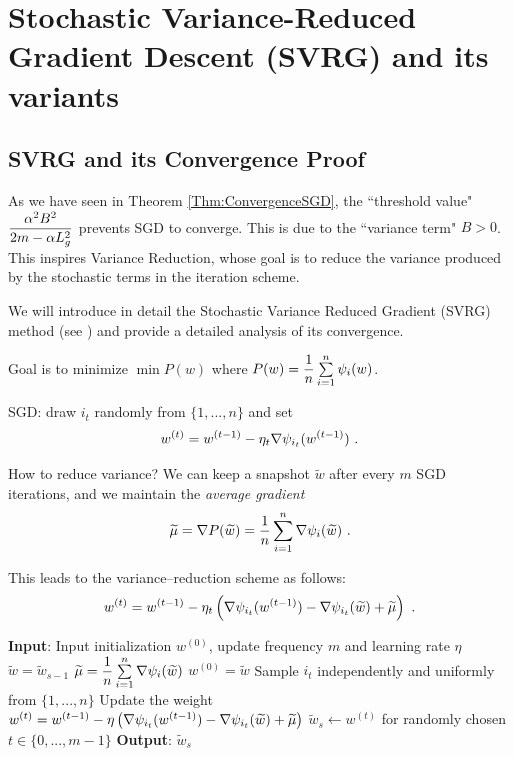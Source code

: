 \section{Stochastic Variance-Reduced Gradient Descent (SVRG) and its variants}

\subsection{SVRG and its Convergence Proof}

As we have seen in Theorem \ref{Thm:ConvergenceSGD}, the ``threshold value" $\dfrac{\alpha^2 B^2}{2m - \alpha L_g^2}$ prevents SGD to converge. This is due to the ``variance term" $B>0$. This inspires Variance Reduction, whose goal is to reduce the variance produced by the stochastic terms in the iteration scheme.

We will introduce in detail the Stochastic Variance Reduced Gradient (SVRG) method (see \cite{johnsonzhangsvrg2013}) and provide a detailed analysis of its convergence.

Goal is to minimize $\min P(w)$ where $P(w)=\dfrac{1}{n}\sum\limits_{i=1}^n \psi_i(w)$.

SGD: draw $i_t$ randomly from $\{1,...,n\}$ and set
$$w^{(t)}=w^{(t-1)}-\eta_t \nabla \psi_{i_t}(w^{(t-1)}) \ .$$

How to reduce variance? We can keep a snapshot $\widetilde{w}$ after every $m$ SGD iterations, and we
maintain the \textit{average gradient}
$$\widetilde{\mu}=\nabla P(\widetilde{w})=\dfrac{1}{n}\sum\limits_{i=1}^n \nabla \psi_i(\widetilde{w}) \ .$$

This leads to the variance--reduction scheme as follows:
$$w^{(t)}=w^{(t-1)}-\eta_t\left(\nabla \psi_{i_t}(w^{(t-1)})-\nabla \psi_{i_t}(\widetilde{w})+\widetilde{\mu}\right) \ .$$

\begin{algorithm}[H]
\caption{Stochastic Variance Reduced Gradient (SVRG)}
\label{Alg:SVRG}
\begin{algorithmic}[1]
\STATE \textbf{Input}: Input initialization $w^{(0)}$, update frequency $m$ and learning rate $\eta$
    \STATE $\widetilde{w}=\widetilde{w}_{s-1}$
    \STATE $\widetilde{\mu}=\dfrac{1}{n}\sum\limits_{i=1}^n \nabla \psi_i(\widetilde{w})$
    \STATE $w^{(0)}=\widetilde{w}$
        \STATE Sample $i_t$ independently and uniformly from $\{1,...,n\}$
        \STATE Update the weight $w^{(t)}=w^{(t-1)}-\eta \left(\nabla \psi_{i_t}(w^{(t-1)})-\nabla \psi_{i_t}(\widetilde{w})+\widetilde{\mu}\right)$
    \ENDFOR
    \STATE $\widetilde{w}_s\leftarrow w^{(t)}$ for randomly chosen $t\in \{0,...,m-1\}$
\ENDFOR
\STATE \textbf{Output}: $\widetilde{w}_s$
\end{algorithmic}
\end{algorithm}

